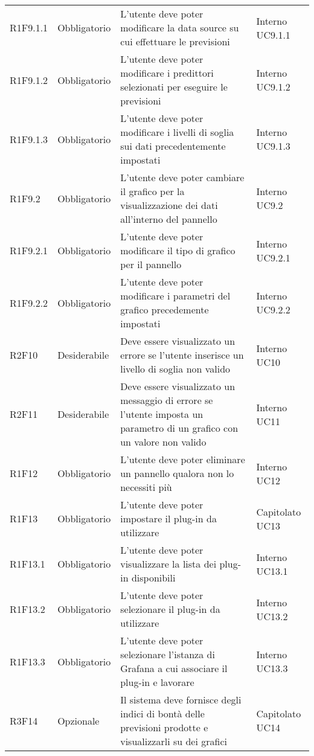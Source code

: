 \begin{longtable} {
		>{}p{24mm} 
		>{}p{32mm}
		>{}p{40mm} 
		>{}p{24.5mm}
		}
		R1F9.1.1 & Obbligatorio & L'utente deve poter modificare la data source su cui effettuare le previsioni & Interno UC9.1.1 \TBstrut \\ [2mm]
		R1F9.1.2 & Obbligatorio & L'utente deve poter modificare i predittori selezionati per eseguire le previsioni & Interno UC9.1.2 \TBstrut \\ [2mm]
		R1F9.1.3 & Obbligatorio & L'utente deve poter modificare i livelli di soglia sui dati precedentemente impostati & Interno UC9.1.3 \TBstrut \\ [2mm]
		R1F9.2 & Obbligatorio & L'utente deve poter cambiare il grafico per la visualizzazione dei dati all'interno del pannello & Interno UC9.2 \TBstrut \\ [2mm]
		R1F9.2.1 & Obbligatorio & L'utente deve poter modificare il tipo di grafico per il pannello & Interno UC9.2.1 \TBstrut \\ [2mm]
		R1F9.2.2 & Obbligatorio & L'utente deve poter modificare i parametri del grafico precedemente impostati & Interno UC9.2.2 \TBstrut \\ [2mm]
		R2F10 & Desiderabile & Deve essere visualizzato un errore se l'utente inserisce un livello di soglia non valido & Interno UC10 \TBstrut \\ [2mm]
		R2F11 & Desiderabile & Deve essere visualizzato un messaggio di errore se l'utente imposta un parametro di un grafico con un valore non valido & Interno UC11 \TBstrut \\ [2mm]
		R1F12 & Obbligatorio & L'utente deve poter eliminare un pannello qualora non lo necessiti più & Interno UC12 \TBstrut \\ [2mm]
		R1F13 & Obbligatorio & L'utente deve poter impostare il plug-in da utilizzare & Capitolato UC13 \TBstrut \\ [2mm]
		R1F13.1 & Obbligatorio & L'utente deve poter visualizzare la lista dei plug-in disponibili & Interno UC13.1 \TBstrut \\ [2mm]
        R1F13.2 & Obbligatorio & L'utente deve poter selezionare il plug-in da utilizzare & Interno UC13.2 \TBstrut \\ [2mm]
		R1F13.3 & Obbligatorio & L'utente deve poter selezionare l'istanza di Grafana a cui associare il plug-in e lavorare & Interno UC13.3 \TBstrut \\ [2mm]
		R3F14 & Opzionale & Il sistema deve fornisce degli indici di bontà delle previsioni prodotte e visualizzarli su dei grafici & Capitolato UC14 \TBstrut \\ [2mm]
	\end{longtable}